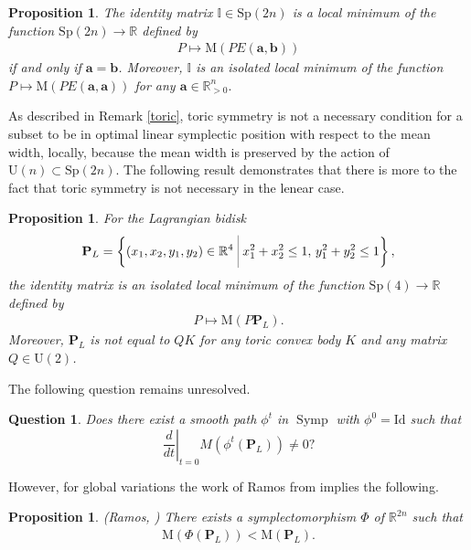 \documentclass[12pt]{amsart}
\newtheorem{proposition}[theorem]{Proposition}
\newtheorem{question}[theorem]{Question}
\theoremstyle{definition}
\newcommand\Symp{\operatorname{Symp}}
\def\bigmid{\ \rule[-3.5mm]{0.1mm}{9mm}\ }
\newcommand{\II}{{\mathbb I}}
\newcommand{\RR}{{\mathbb R}}
\newcommand{\mw}{{{\mathrm {M}}}}
\begin{document}
\begin{proposition}\label{ellipsoid}
The identity matrix  $\II \in \mathrm{Sp}(2n)$  is a local minimum of the function $\mathrm{Sp}(2n) \to \RR$ defined by 
\begin{align*}
 P \mapsto \mw(PE(\mathbf{a}, \mathbf{b} ))
\end{align*} 
if and only if $\mathbf{a}= \mathbf{b}$. Moreover, $\II$ is an isolated local minimum of the function $P \mapsto \mw(PE(\mathbf{a}, \mathbf{a} ))$ for any $\mathbf{a} \in \RR^n_{>0}.$
\end{proposition}


As described in Remark \ref{toric}, toric symmetry is not a necessary condition for a subset to be in optimal linear symplectic position with respect to the mean width, locally, because the mean width is preserved by the action of $\mathrm{U}(n) \subset \mathrm{Sp}(2n) $. The following result demonstrates that there is more to the fact that toric symmetry is not necessary in the lenear case. 

\begin{proposition}\label{lag}
For the Lagrangian bidisk
$$\mathbf{P}_L = \left\{ (x_1, x_{2}, y_1, y_{2}) \in \mathbb{R}^{4} \bigmid  x_1^2 +x_2^2 \leq 1,\, y_1^2 +y_2^2 \leq 1\right\},$$ the identity matrix is an isolated  local minimum of the function  $\mathrm{Sp}(4) \to \RR$ defined by
\begin{align*}
 P \mapsto \mw(P \mathbf{P}_L).
\end{align*} 
Moreover, $\mathbf{P}_L$ is not equal to $QK$ for any toric convex body $K$ and any matrix $Q \in \mathrm{U}(2)$.
\end{proposition}

The following question remains unresolved.
\begin{question}
    Does there exist a smooth path $\phi^t$ in $\Symp$ with $\phi^0 = \mathrm{Id}$ such that $$\left.\frac{d}{dt}\right|_{t=0} M(\phi^t(\mathbf{P}_L)) \neq 0?$$
\end{question}

However, for global variations the work of Ramos from \cite{vr} implies the following.

\begin{proposition}\label{vr}(Ramos, \cite{vr})
There exists a symplectomorphism $\Phi$ of $\RR^{2n}$ such that
\begin{align*}
  \mw (\Phi(\mathbf{P}_L))<\mw (\mathbf{P}_L).
  \end{align*}
\end{proposition}
\end{document}
